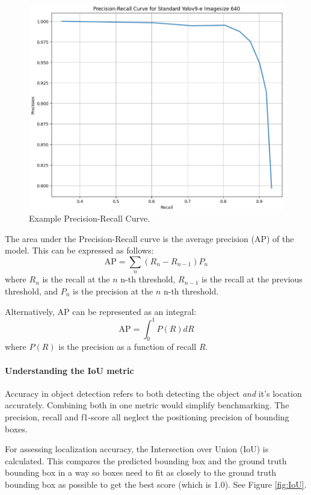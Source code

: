 \begin{figure}
    \centering
    \includegraphics[width=0.7\linewidth]{Images/Results/PR-curve standard e 640.png}
    \caption{\centering Example Precision-Recall Curve.}
    \label{fig:precisionrecallcurveexample}
\end{figure}

The area under the Precision-Recall curve is the average precision (AP) of the model. This can be expressed as follows:
\begin{equation}
    \text{AP} = \sum_{n} (R_n - R_{n-1}) P_n
\end{equation}
where $R_n$ is the recall at the $n$ n-th threshold, $R_{n-1}$ is the recall at the previous threshold, and $P_n$ is the precision at the $n$ n-th threshold.

Alternatively, AP can be represented as an integral:
\begin{equation}
    \text{AP} = \int_{0}^{1} P(R) dR
\end{equation}
where $P(R)$ is the precision as a function of recall $R$.


\paragraph{Understanding the IoU metric}

Accuracy in object detection refers to both detecting the object \textit{and} it's location accurately. Combining both in one metric would simplify benchmarking. The precision, recall and f1-score all neglect the positioning precision of bounding boxes.

For assessing localization accuracy, the Intersection over Union (IoU) is calculated. This compares the predicted bounding box and the ground truth bounding box in a way so boxes need to fit as closely to the ground truth bounding box as possible to get the best score (which is 1.0). See Figure \ref{fig:IoU}. 

